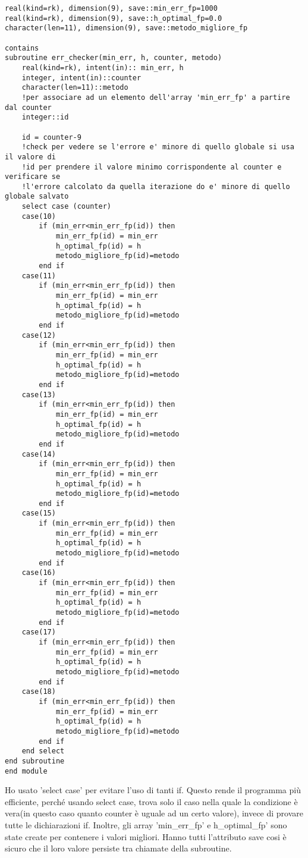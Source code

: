 \documentclass[a4paper]{article}
\begin{document}
{\begin{lstlisting}[firstnumber = 24]
real(kind=rk), dimension(9), save::min_err_fp=1000
real(kind=rk), dimension(9), save::h_optimal_fp=0.0
character(len=11), dimension(9), save::metodo_migliore_fp

contains
subroutine err_checker(min_err, h, counter, metodo)
    real(kind=rk), intent(in):: min_err, h
    integer, intent(in)::counter
    character(len=11)::metodo
    !per associare ad un elemento dell'array 'min_err_fp' a partire dal counter
    integer::id

    id = counter-9
    !check per vedere se l'errore e' minore di quello globale si usa il valore di
    !id per prendere il valore minimo corrispondente al counter e verificare se 
    !l'errore calcolato da quella iterazione do e' minore di quello globale salvato
    select case (counter)
    case(10)
        if (min_err<min_err_fp(id)) then
            min_err_fp(id) = min_err
            h_optimal_fp(id) = h
            metodo_migliore_fp(id)=metodo
        end if
    case(11)
        if (min_err<min_err_fp(id)) then
            min_err_fp(id) = min_err
            h_optimal_fp(id) = h
            metodo_migliore_fp(id)=metodo
        end if
    case(12) 
        if (min_err<min_err_fp(id)) then
            min_err_fp(id) = min_err
            h_optimal_fp(id) = h
            metodo_migliore_fp(id)=metodo
        end if
    case(13) 
        if (min_err<min_err_fp(id)) then
            min_err_fp(id) = min_err
            h_optimal_fp(id) = h
            metodo_migliore_fp(id)=metodo
        end if
    case(14) 
        if (min_err<min_err_fp(id)) then
            min_err_fp(id) = min_err
            h_optimal_fp(id) = h
            metodo_migliore_fp(id)=metodo
        end if
    case(15) 
        if (min_err<min_err_fp(id)) then
            min_err_fp(id) = min_err
            h_optimal_fp(id) = h
            metodo_migliore_fp(id)=metodo
        end if
    case(16) 
        if (min_err<min_err_fp(id)) then
            min_err_fp(id) = min_err
            h_optimal_fp(id) = h
            metodo_migliore_fp(id)=metodo
        end if
    case(17) 
        if (min_err<min_err_fp(id)) then
            min_err_fp(id) = min_err
            h_optimal_fp(id) = h
            metodo_migliore_fp(id)=metodo
        end if
    case(18) 
        if (min_err<min_err_fp(id)) then
            min_err_fp(id) = min_err
            h_optimal_fp(id) = h
            metodo_migliore_fp(id)=metodo
        end if
    end select 
end subroutine
end module
\end{lstlisting}
Ho usato 'select case' per evitare l'uso di tanti if. Questo rende il programma più efficiente, perché usando select case, trova solo il caso nella quale la condizione è vera(in questo caso quanto counter è uguale ad un certo valore), invece di provare tutte le dichiarazioni if. Inoltre, gli array 'min\_err\_fp' e h\_optimal\_fp' sono state create per contenere i valori migliori. Hanno tutti l'attributo save cosi è sicuro che il loro valore persiste tra chiamate della subroutine. 

}
\end{document}
